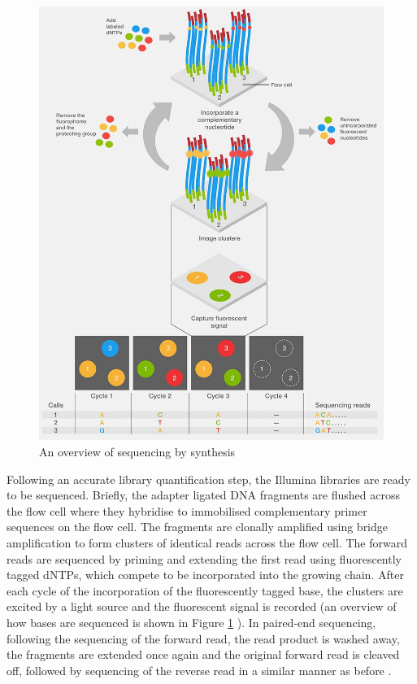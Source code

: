 \begin{figure}[htbp!] 
\centering    
    \includegraphics[width=1\textwidth]{Chapter1/Figs/illumina-sequencing.jpg}
\caption{An overview of sequencing by synthesis \cite{RN313}}
\label{fig:illumina_sequencing}
\captionsetup{font=small}
\end{figure}

Following an accurate library quantification step, the Illumina libraries are ready to be sequenced. Briefly, the adapter ligated DNA fragments are flushed across the flow cell where they hybridise to immobilised complementary primer sequences on the flow cell. The fragments are clonally amplified using bridge amplification to form clusters of identical reads across the flow cell. The forward reads are sequenced by priming and extending the first read using fluorescently tagged dNTPs, which compete to be incorporated into the growing chain. After each cycle of the incorporation of the fluorescently tagged base, the clusters are excited by a light source and the fluorescent signal is recorded (an overview of how bases are sequenced is shown in Figure \ref{fig:illumina_sequencing} \cite{RN313}). In paired-end sequencing, following the sequencing of the forward read, the read product is washed away, the fragments are extended once again and the original forward read is cleaved off, followed by sequencing of the reverse read in a similar manner as before \cite{RN313}. 

